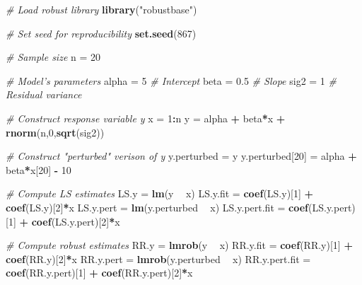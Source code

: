 \documentclass[]{book}
\newenvironment{Shaded}{\begin{snugshade}}{\end{snugshade}}
\newcommand{\CommentTok}[1]{\textcolor[rgb]{0.56,0.35,0.01}{\textit{#1}}}
\newcommand{\DecValTok}[1]{\textcolor[rgb]{0.00,0.00,0.81}{#1}}
\newcommand{\FloatTok}[1]{\textcolor[rgb]{0.00,0.00,0.81}{#1}}
\newcommand{\KeywordTok}[1]{\textcolor[rgb]{0.13,0.29,0.53}{\textbf{#1}}}
\newcommand{\NormalTok}[1]{#1}
\newcommand{\OperatorTok}[1]{\textcolor[rgb]{0.81,0.36,0.00}{\textbf{#1}}}
\newcommand{\StringTok}[1]{\textcolor[rgb]{0.31,0.60,0.02}{#1}}
\theoremstyle{definition}
\theoremstyle{definition}
\theoremstyle{definition}
\theoremstyle{remark}
\begin{document}
\begin{Shaded}
\begin{Highlighting}[]
\CommentTok{# Load robust library}
\KeywordTok{library}\NormalTok{(}\StringTok{"robustbase"}\NormalTok{)}

\CommentTok{# Set seed for reproducibility}
\KeywordTok{set.seed}\NormalTok{(}\DecValTok{867}\NormalTok{)}

\CommentTok{# Sample size}
\NormalTok{n =}\StringTok{ }\DecValTok{20}      

\CommentTok{# Model's parameters}
\NormalTok{alpha =}\StringTok{ }\DecValTok{5}    \CommentTok{# Intercept }
\NormalTok{beta =}\StringTok{ }\FloatTok{0.5}   \CommentTok{# Slope }
\NormalTok{sig2 =}\StringTok{ }\DecValTok{1}     \CommentTok{# Residual variance}

\CommentTok{# Construct response variable y}
\NormalTok{x =}\StringTok{ }\DecValTok{1}\OperatorTok{:}\NormalTok{n }
\NormalTok{y =}\StringTok{ }\NormalTok{alpha }\OperatorTok{+}\StringTok{ }\NormalTok{beta}\OperatorTok{*}\NormalTok{x }\OperatorTok{+}\StringTok{ }\KeywordTok{rnorm}\NormalTok{(n,}\DecValTok{0}\NormalTok{,}\KeywordTok{sqrt}\NormalTok{(sig2))}

\CommentTok{# Construct "perturbed" verison of y}
\NormalTok{y.perturbed =}\StringTok{ }\NormalTok{y}
\NormalTok{y.perturbed[}\DecValTok{20}\NormalTok{] =}\StringTok{ }\NormalTok{alpha }\OperatorTok{+}\StringTok{ }\NormalTok{beta}\OperatorTok{*}\NormalTok{x[}\DecValTok{20}\NormalTok{] }\OperatorTok{-}\StringTok{ }\DecValTok{10}

\CommentTok{# Compute LS estimates}
\NormalTok{LS.y =}\StringTok{ }\KeywordTok{lm}\NormalTok{(y }\OperatorTok{~}\StringTok{ }\NormalTok{x)}
\NormalTok{LS.y.fit =}\StringTok{ }\KeywordTok{coef}\NormalTok{(LS.y)[}\DecValTok{1}\NormalTok{] }\OperatorTok{+}\StringTok{ }\KeywordTok{coef}\NormalTok{(LS.y)[}\DecValTok{2}\NormalTok{]}\OperatorTok{*}\NormalTok{x}
\NormalTok{LS.y.pert =}\StringTok{ }\KeywordTok{lm}\NormalTok{(y.perturbed }\OperatorTok{~}\StringTok{ }\NormalTok{x)}
\NormalTok{LS.y.pert.fit =}\StringTok{ }\KeywordTok{coef}\NormalTok{(LS.y.pert)[}\DecValTok{1}\NormalTok{] }\OperatorTok{+}\StringTok{ }\KeywordTok{coef}\NormalTok{(LS.y.pert)[}\DecValTok{2}\NormalTok{]}\OperatorTok{*}\NormalTok{x}

\CommentTok{# Compute robust estimates}
\NormalTok{RR.y =}\StringTok{ }\KeywordTok{lmrob}\NormalTok{(y }\OperatorTok{~}\StringTok{ }\NormalTok{x)}
\NormalTok{RR.y.fit =}\StringTok{ }\KeywordTok{coef}\NormalTok{(RR.y)[}\DecValTok{1}\NormalTok{] }\OperatorTok{+}\StringTok{ }\KeywordTok{coef}\NormalTok{(RR.y)[}\DecValTok{2}\NormalTok{]}\OperatorTok{*}\NormalTok{x}
\NormalTok{RR.y.pert =}\StringTok{ }\KeywordTok{lmrob}\NormalTok{(y.perturbed }\OperatorTok{~}\StringTok{ }\NormalTok{x)}
\NormalTok{RR.y.pert.fit =}\StringTok{ }\KeywordTok{coef}\NormalTok{(RR.y.pert)[}\DecValTok{1}\NormalTok{] }\OperatorTok{+}\StringTok{ }\KeywordTok{coef}\NormalTok{(RR.y.pert)[}\DecValTok{2}\NormalTok{]}\OperatorTok{*}\NormalTok{x}


\end{Highlighting}
\end{Shaded}
\end{document}

